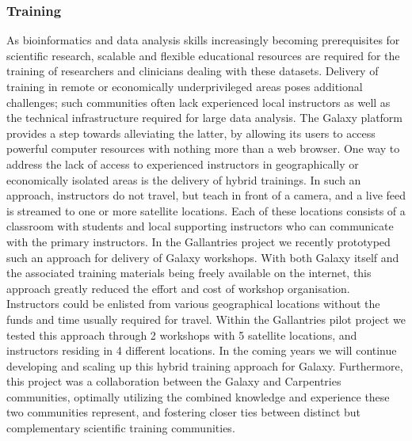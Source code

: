 \subsubsection{Training}
As bioinformatics and data analysis skills increasingly becoming prerequisites for scientific research, scalable and flexible educational resources are required for the training of researchers and clinicians dealing with these datasets.
Delivery of training in remote or economically underprivileged areas poses additional challenges; such communities often lack experienced local instructors as well as the technical infrastructure required for large data analysis.
The Galaxy platform provides a step towards alleviating the latter, by allowing its users to access powerful computer resources with nothing more than a web browser. One way to address the lack of access to experienced instructors in geographically or economically isolated areas is the delivery of hybrid trainings.
In such an approach, instructors do not travel, but teach in front of a camera, and a live feed is streamed to one or more satellite locations. Each of these locations consists of a classroom with students and local supporting instructors who can communicate with the primary instructors. In the Gallantries project \cite{gallantries} we recently prototyped such an approach for delivery of Galaxy workshops.
With both Galaxy itself and the associated training materials being freely available on the internet, this approach greatly reduced the effort and cost of workshop organisation.
Instructors could be enlisted from various geographical locations without the funds and time usually required for travel. Within the Gallantries pilot project we tested this approach through 2 workshops with 5 satellite locations, and instructors residing in 4 different locations.
In the coming years we will continue developing and scaling up this hybrid training approach for Galaxy. Furthermore, this project was a collaboration between the Galaxy and Carpentries \cite{wilson2006software} communities, optimally utilizing the combined knowledge and experience these two communities represent, and fostering closer ties between distinct but complementary scientific training communities.


